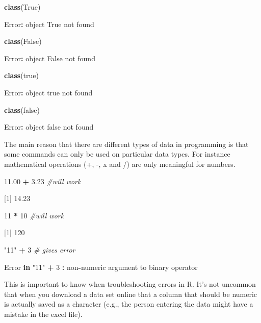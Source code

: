 \documentclass[
]{book}
\newenvironment{Shaded}{\begin{snugshade}}{\end{snugshade}}
\newcommand{\CommentTok}[1]{\textcolor[rgb]{0.56,0.35,0.01}{\textit{#1}}}
\newcommand{\ControlFlowTok}[1]{\textcolor[rgb]{0.13,0.29,0.53}{\textbf{#1}}}
\newcommand{\DecValTok}[1]{\textcolor[rgb]{0.00,0.00,0.81}{#1}}
\newcommand{\FloatTok}[1]{\textcolor[rgb]{0.00,0.00,0.81}{#1}}
\newcommand{\FunctionTok}[1]{\textcolor[rgb]{0.13,0.29,0.53}{\textbf{#1}}}
\newcommand{\NormalTok}[1]{#1}
\newcommand{\SpecialCharTok}[1]{\textcolor[rgb]{0.81,0.36,0.00}{\textbf{#1}}}
\newcommand{\StringTok}[1]{\textcolor[rgb]{0.31,0.60,0.02}{#1}}
\begin{document}
\begin{Shaded}
\begin{Highlighting}[]
\FunctionTok{class}\NormalTok{(True)}

\NormalTok{Error}\SpecialCharTok{:}\NormalTok{ object }\StringTok{\textquotesingle{}True\textquotesingle{}}\NormalTok{ not found}

\FunctionTok{class}\NormalTok{(False)}

\NormalTok{Error}\SpecialCharTok{:}\NormalTok{ object }\StringTok{\textquotesingle{}False\textquotesingle{}}\NormalTok{ not found}

\FunctionTok{class}\NormalTok{(true)}

\NormalTok{Error}\SpecialCharTok{:}\NormalTok{ object }\StringTok{\textquotesingle{}true\textquotesingle{}}\NormalTok{ not found}

\FunctionTok{class}\NormalTok{(false)}

\NormalTok{Error}\SpecialCharTok{:}\NormalTok{ object }\StringTok{\textquotesingle{}false\textquotesingle{}}\NormalTok{ not found}
\end{Highlighting}
\end{Shaded}

The main reason that there are different types of data in programming is that some commands can only be used on particular data types. For instance mathematical operations (+, -, x and /) are only meaningful for numbers.

\begin{Shaded}
\begin{Highlighting}[]
\FloatTok{11.00} \SpecialCharTok{+} \FloatTok{3.23} \CommentTok{\#will work}

\NormalTok{[}\DecValTok{1}\NormalTok{] }\FloatTok{14.23}


\DecValTok{11} \SpecialCharTok{*} \DecValTok{10} \CommentTok{\#will work}

\NormalTok{[}\DecValTok{1}\NormalTok{] }\DecValTok{120}

\StringTok{"11"} \SpecialCharTok{+} \DecValTok{3} \CommentTok{\# gives error}

\NormalTok{Error }\ControlFlowTok{in} \StringTok{"11"} \SpecialCharTok{+} \DecValTok{3} \SpecialCharTok{:}\NormalTok{ non}\SpecialCharTok{{-}}\NormalTok{numeric argument to binary operator}
\end{Highlighting}
\end{Shaded}

This is important to know when troubleshooting errors in R. It's not uncommon that when you download a data set online that a column that should be numeric is actually saved as a character (e.g., the person entering the data might have a mistake in the excel file).
\end{document}
